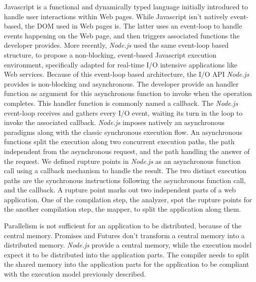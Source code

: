 Javascript is a functional and dynamically typed language initially introduced to handle user interactions within Web pages.
While Javascript isn't natively event-based, the DOM used in Web pages is.
The latter uses an event-loop to handle events happening on the Web page, and then triggers associated functions the developer provides.
More recently, \textit{Node.js} used the same event-loop based structure, to propose a non-blocking, event-based Javascript execution environment, specifically adapted for real-time I/O intensive applications like Web services.
Because of this event-loop based architecture, the I/O API \textit{Node.js} provides is non-blocking and asynchronous.
The developer provide an handler function as argument for this asynchronous function to invoke when the operation completes.
This handler function is commonly named a callback.%
The \textit{Node.js} event-loop receives and gathers every I/O event, waiting its turn in the loop to invoke the associated callback.
\textit{Node.js} imposes natively an asynchronous paradigms along with the classic synchronous execution flow.
An asynchronous functions split the execution along two concurrent execution paths, the path independent from the asynchronous request, and the path handling the answer of the request.
We defined rupture points in \textit{Node.js} as an asynchronous function call using a callback mechanism to handle the result.
The two distinct execution paths are the synchronous instructions following the asynchronous function call, and the callback.
A rupture point marks out two independent parts of a web application.
One of the compilation step, the analyzer, spot the rupture points for the another compilation step, the mapper, to split the application along them.

Parallelism is not sufficient for an application to be distributed, because of the central memory.
Promises and Futures don't transform a central memory into a distributed memory.
\textit{Node.js} provide a central memory, while the execution model expect it to be distributed into the application parts.
The compiler needs to split the shared memory into the application parts for the application to be compliant with the execution model previously described.

